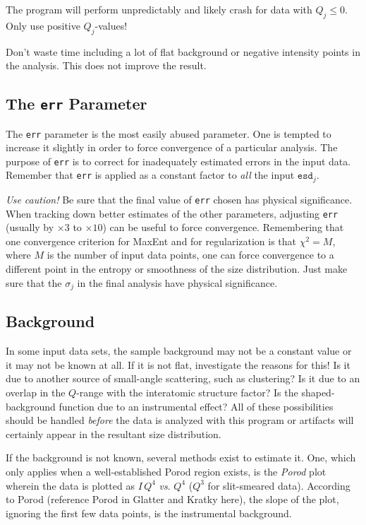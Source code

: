 \documentclass[letterpaper]{article}
\begin{document}
The program will perform unpredictably and likely crash 
for data with $Q_j \leq 0$.  Only use positive $Q_j$-values!

Don't waste time including a lot of flat background or 
negative intensity points in the analysis.  This does not 
improve the result.

\subsection{The \texttt{err} Parameter}

The \texttt{err} parameter is the most easily abused 
parameter.  One is tempted to increase it slightly in 
order to force convergence of a particular analysis.  The 
purpose of \texttt{err} is to correct for 
inadequately estimated errors in the input data.  Remember 
that \texttt{err} is applied as a constant factor to \emph{all} the 
input $\mathtt{esd}_j$.
 
\emph{Use caution!}  Be sure that the final value of 
\texttt{err} chosen has physical significance.  
When tracking down better estimates of the other parameters, 
adjusting \texttt{err} (usually by $\times 3$ to $\times 10$) 
can be useful to force convergence.  Remembering that one 
convergence criterion for MaxEnt and for regularization is 
that $\chi^2 = M$, where $M$ is the number of input data 
points, one can force convergence to a different point in 
the entropy or smoothness of the size distribution.  Just 
make sure that the $\sigma_j$ in the final analysis have physical 
significance.

\subsection{Background}

In some input data sets, the sample background may not 
be a constant value or it may not be known at all.  If it 
is not flat, investigate the reasons for this!  Is it due 
to another source of small-angle scattering, such as 
clustering?  Is it due to an overlap in the $Q$-range with 
the interatomic structure factor?  Is the 
shaped-background function due to an instrumental effect?
All of these possibilities should be handled \emph{before} 
the data is analyzed with this program or artifacts will 
certainly appear in the resultant size distribution.

If the background is not known, several methods exist to 
estimate it.  One, which only applies when a 
well-established Porod region exists, 
is the \emph{Porod} plot wherein the 
data is plotted as $I\,Q^4$ \emph{vs}. $Q^4$ ($Q^3$ for 
slit-smeared data).  According to Porod (reference Porod 
in Glatter and Kratky here), the slope of the plot, ignoring the 
first few data points, is the instrumental background.
\end{document}
